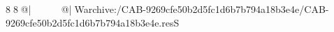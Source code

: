 8  8  @|                                                   @| W   archive:/CAB-9269cfe50b2d5fc1d6b7b794a18b3e4e/CAB-9269cfe50b2d5fc1d6b7b794a18b3e4e.resS 